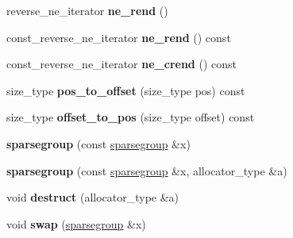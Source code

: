 \begin{DoxyCompactItemize}
\item 
reverse\+\_\+ne\+\_\+iterator {\bfseries ne\+\_\+rend} ()\hypertarget{classspp___1_1sparsegroup_a17214d0d5ac29cf8c0828968ab5ae287}{}\label{classspp___1_1sparsegroup_a17214d0d5ac29cf8c0828968ab5ae287}

\item 
const\+\_\+reverse\+\_\+ne\+\_\+iterator {\bfseries ne\+\_\+rend} () const \hypertarget{classspp___1_1sparsegroup_a47005f639c4637c5239303ab3f55e0d4}{}\label{classspp___1_1sparsegroup_a47005f639c4637c5239303ab3f55e0d4}

\item 
const\+\_\+reverse\+\_\+ne\+\_\+iterator {\bfseries ne\+\_\+crend} () const \hypertarget{classspp___1_1sparsegroup_aae1e331a045546c187f20bb734209120}{}\label{classspp___1_1sparsegroup_aae1e331a045546c187f20bb734209120}

\item 
size\+\_\+type {\bfseries pos\+\_\+to\+\_\+offset} (size\+\_\+type pos) const \hypertarget{classspp___1_1sparsegroup_a2f23f04891d7d8a2067319231b252b00}{}\label{classspp___1_1sparsegroup_a2f23f04891d7d8a2067319231b252b00}

\item 
size\+\_\+type {\bfseries offset\+\_\+to\+\_\+pos} (size\+\_\+type offset) const \hypertarget{classspp___1_1sparsegroup_acc837dfaed40a5d0fee210d971823e17}{}\label{classspp___1_1sparsegroup_acc837dfaed40a5d0fee210d971823e17}

\item 
{\bfseries sparsegroup} (const \hyperlink{classspp___1_1sparsegroup}{sparsegroup} \&x)\hypertarget{classspp___1_1sparsegroup_afc3627553f3b8c2d463d694548ddb779}{}\label{classspp___1_1sparsegroup_afc3627553f3b8c2d463d694548ddb779}

\item 
{\bfseries sparsegroup} (const \hyperlink{classspp___1_1sparsegroup}{sparsegroup} \&x, allocator\+\_\+type \&a)\hypertarget{classspp___1_1sparsegroup_ab30df8152782070df85f97725441e6ae}{}\label{classspp___1_1sparsegroup_ab30df8152782070df85f97725441e6ae}

\item 
void {\bfseries destruct} (allocator\+\_\+type \&a)\hypertarget{classspp___1_1sparsegroup_a7637aa59c1fc8746679c42ef7653aac4}{}\label{classspp___1_1sparsegroup_a7637aa59c1fc8746679c42ef7653aac4}

\item 
void {\bfseries swap} (\hyperlink{classspp___1_1sparsegroup}{sparsegroup} \&x)\hypertarget{classspp___1_1sparsegroup_ab6f3842a37006ef82e8dcdd9e207f186}{}\label{classspp___1_1sparsegroup_ab6f3842a37006ef82e8dcdd9e207f186}


\end{DoxyCompactItemize}
